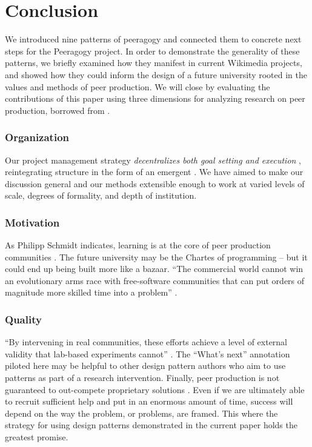 \section{Conclusion}\label{sec:Conclusion}

We introduced nine patterns of peeragogy and connected them to
concrete next steps for the Peeragogy project.  In order to
demonstrate the generality of these patterns, we briefly examined how
they manifest in current Wikimedia projects, and showed how they could
inform the design of a future university rooted in the values and
methods of peer production.
We will close by evaluating the contributions of this paper using
three dimensions for analyzing research on peer production, borrowed
from \cite{benkler2015peer}.

\vspace{-.25\baselineskip}

\subsubsection*{Organization} 
Our project management strategy \emph{decentralizes both goal setting
  and execution} \cite{benkler2015peer}, reintegrating structure in
the form of an emergent .  We have aimed to make
our discussion general and our methods extensible enough to work at
varied levels of scale, degrees of formality, and depth of
institution.

\vspace{-.25\baselineskip}

\subsubsection*{Motivation}  As Philipp Schmidt indicates, learning
is at the core of peer production communities
\cite{schmidt+commons-based+2009}.  The future university may be the
Chartes of programming -- but it could end up being built more like a
bazaar.  ``The commercial world cannot win an evolutionary arms race
with free-software communities that can put orders of magnitude more
skilled time into a problem'' \cite{raymond2001cathedral}.

\vspace{-.25\baselineskip}

\subsubsection*{Quality} 
``By intervening in real communities, these efforts achieve a level of
external validity that lab-based experiments cannot''
\cite{benkler2015peer}.  The ``What's next'' annotation piloted here
may be helpful to other design pattern authors who aim to use patterns
as part of a research intervention.  Finally, peer production is not
guaranteed to out-compete proprietary solutions
\cite{benkler2015peer,free-software-better}.  Even if we are
ultimately able to recruit sufficient help and put in an enormous
amount of time, success will depend on the way the problem, or
problems, are framed.  This where the strategy for using design
patterns demonstrated in the current paper holds the greatest promise.

